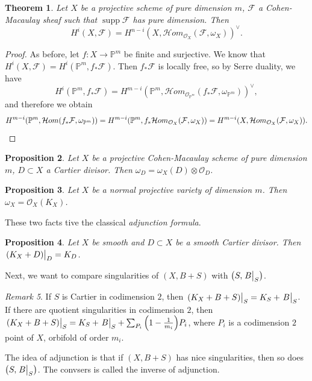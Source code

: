 \documentclass[leqno, openany]{memoir}
\newtheorem{thm}{Theorem}[section]
\newtheorem{prop}[thm]{Proposition}
\theoremstyle{definition}
\theoremstyle{remark}
\newtheorem{rmk}[thm]{Remark}
\theoremstyle{plain}
\theoremstyle{definition}
\theoremstyle{remark}
\renewcommand{\P}{\mathbb{P}}
\newcommand{\mc}[1]{\mathcal{#1}}
\DeclareMathOperator{\supp}{supp}
\begin{document}
\begin{thm}
    Let $X$ be a projective scheme of pure dimension $m$, $\mc{F}$ a Cohen-Macaulay sheaf such that $\supp \mc{F}$ has pure dimension. Then
    \[ H^i(X, \mc{F}) = {H^{n-i}(X, \mc{H}om_{\mc{O}_X}(\mc{F}, \omega_X))}^{\vee}. \]
\end{thm}

\begin{proof}
    As before, let $f \colon X \to \P^m$ be finite and surjective. We know that $H^i(X, \mc{F}) = H^i(\P^m, f_* \mc{F})$. Then $f_* \mc{F}$ is locally free, so by Serre duality, we have
    \[ H^i(\P^m, f_* \mc{F}) = { H^{m-i}(\P^m, \mc{H}om_{\mc{O}_{\P^m}}(f_* \mc{F}, \omega_{\P^m})) }^{\vee}, \]
    and therefore we obtain
    \[ H^{m-i}(\P^m, \mc{H}om(f_* \mc{F}, \omega_{\P^m})) = H^{m-i}(\P^m, f_* \mc{H}om_{\mc{O}_X}(\mc{F}, \omega_X)) = H^{m-i}(X, \mc{H}om_{\mc{O}_X}(\mc{F}, \omega_X)). \qedhere \] 
\end{proof}

\begin{prop}
    Let $X$ be a projective Cohen-Macaulay scheme of pure dimension $m$, $D \subset X$ a Cartier divisor. Then $\omega_D = \omega_X(D) \otimes \mc{O}_D$. 
\end{prop}

\begin{prop}
    Let $X$ be a normal projective variety of dimension $m$. Then $\omega_X = \mc{O}_X(K_X)$.
\end{prop}

These two facts tive the classical \textit{adjunction formula}.
\begin{prop}
    Let $X$ be smooth and $D \subset X$ be a smooth Cartier divisor. Then $\eval{(K_X + D)}_D = K_D$.
\end{prop}

Next, we want to compare singularities of $(X, B+S)$ with $\qty(S, \eval{B}_S)$. 

\begin{rmk}
    If $S$ is Cartier in codimension $2$, then $\eval{(K_X + B + S)}_S = K_S + \eval{B}_S$. If there are quotient singularities in codimension $2$, then $\eval{(K_X + B + S)}_S = K_S + \eval{B}_S + \sum_{P_i} \qty(1 - \frac{1}{m_i}) P_i$, where $P_i$ is a codimension $2$ point of $X$, orbifold of order $m_i$.
\end{rmk}

The idea of adjunction is that if $(X, B+S)$ has nice singularities, then so does $\qty(S, \eval{B}_S)$. The convsers is called the inverse of adjunction.
\end{document}

